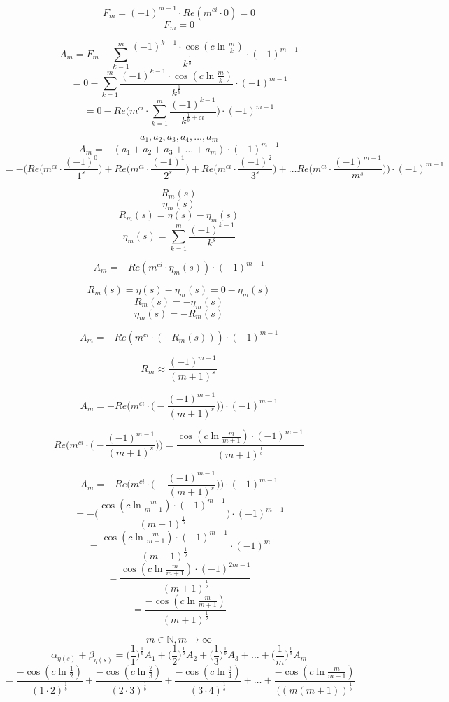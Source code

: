 \documentclass{amsart}
\begin{document}
	
	\[ F_m = (-1)^{m-1} \cdot Re(m^{ci} \cdot 0) = 0 \]
	\[ F_m = 0 \]
	
	\[ A_m = F_m - \sum\limits_{k=1}^{m} \frac{(-1)^{k-1} {\cdot} \cos(c \ln \frac{m}{k})}{k^{\frac{1}{b}}} {\cdot} (-1)^{m-1} \]
	\[ = 0 - \sum\limits_{k=1}^{m} \frac{(-1)^{k-1} {\cdot} \cos(c \ln \frac{m}{k})}{k^{\frac{1}{b}}} {\cdot} (-1)^{m-1} \]
	\[ = 0 - Re \Big( m^{ci} {\cdot} \sum\limits_{k=1}^{m}\frac{(-1)^{k-1}}{k^{\frac{1}{b}+ci}}   \Big) {\cdot} (-1)^{m-1}  \]
	
	\[ a_1, a_2, a_3, a_4, \dots , a_m \]
	\[ A_m = -( a_1 + a_2 + a_3 + \dots + a_m ) {\cdot} (-1)^{m-1}  \]
	\[ = - \Bigg( Re\Big( m^{ci}{\cdot}\frac{(-1)^{0}}{1^s}  \Big) + Re\Big( m^{ci}{\cdot}\frac{(-1)^{1}}{2^s}  \Big) + Re\Big( m^{ci}{\cdot}\frac{(-1)^{2}}{3^s}  \Big) + \dots Re\Big( m^{ci}{\cdot}\frac{(-1)^{m-1}}{m^s}  \Big)     \Bigg) {\cdot} (-1)^{m-1} \]
	
	\[ R_m(s) \]
	\[ \eta_m(s) \]
	\[ R_m(s) = \eta(s) - \eta_m(s) \]
	\[ \eta_m(s) = \sum\limits_{k=1}^{m}\frac{(-1)^{k-1}}{k^s}  \]
	
	\[ A_m = - Re(m^{ci} {\cdot} \eta_m(s) ) {\cdot} (-1)^{m-1} \]
	
	\[ R_m(s) = \eta(s) - \eta_m(s) = 0 - \eta_m(s) \]
	\[ R_m(s) = -\eta_m(s) \]
	\[ \eta_m(s) = -R_m(s) \]
	
	\[ A_m = - Re(m^{ci} {\cdot} (-R_m(s)) ) {\cdot} (-1)^{m-1} \]
	
	\[ R_m \approx \frac{(-1)^{m-1}}{(m+1)^s} \]
	
	\[ A_m = - Re\Bigg(m^{ci} {\cdot} \Big(-\frac{(-1)^{m-1}}{(m+1)^s}\Big) \Bigg) {\cdot} (-1)^{m-1} \]
	
	\[ Re\Bigg(m^{ci} {\cdot} \Big(-\frac{(-1)^{m-1}}{(m+1)^s}\Big) \Bigg) = \frac{\cos(c \ln \frac{m}{m+1}){\cdot}(-1)^{m-1}}{(m+1)^{\frac{1}{b}}}  \]
	
	
	\[ A_m = - Re\Bigg(m^{ci} {\cdot} \Big(-\frac{(-1)^{m-1}}{(m+1)^s}\Big) \Bigg) {\cdot} (-1)^{m-1} \]
	\[ = -\Bigg( \frac{\cos(c \ln \frac{m}{m+1}){\cdot}(-1)^{m-1}}{(m+1)^{\frac{1}{b}}} \Bigg) {\cdot} (-1)^{m-1} \]
	\[ = \frac{\cos(c \ln \frac{m}{m+1}){\cdot}(-1)^{m-1}}{(m+1)^{\frac{1}{b}}} {\cdot} (-1)^{m} \]
	\[ =  \frac{\cos(c \ln \frac{m}{m+1}){\cdot}(-1)^{2m-1}}{(m+1)^{\frac{1}{b}}}  \]
	\[ =  \frac{-\cos(c \ln \frac{m}{m+1})}{(m+1)^{\frac{1}{b}}}  \]
	
	\[ m \in \mathbb{N}, m \to \infty \]
	\[ \alpha_{\eta(s)} + \beta_{\eta(s)} = \Big(\frac{1}{1}\Big)^{\frac{1}{b}}A_1 + \Big(\frac{1}{2}\Big)^{\frac{1}{b}}A_2 + \Big(\frac{1}{3}\Big)^{\frac{1}{b}}A_3 + \dots + \Big(\frac{1}{m}\Big)^{\frac{1}{b}}A_m \]
	\[ = \frac{-\cos(c \ln \frac{1}{2})}{(1{\cdot}2)^{\frac{1}{b}}} + \frac{-\cos(c \ln \frac{2}{3})}{(2{\cdot}3)^{\frac{1}{b}}} + \frac{-\cos(c \ln \frac{3}{4})}{(3{\cdot}4)^{\frac{1}{b}}} + \dots + \frac{-\cos(c \ln \frac{m}{m+1})}{((m(m+1))^{\frac{1}{b}}} \]
	
\end{document}
